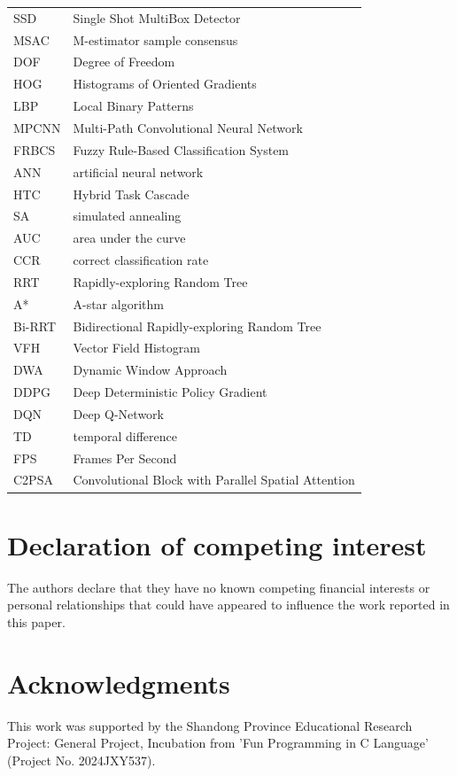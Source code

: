 \documentclass[a4paper,fleqn]{cas-dc}
\begin{document}
{\begin{tabular}{@{}p{2cm}p{5cm}}
  SSD & Single Shot MultiBox Detector \\
  MSAC & M-estimator sample consensus \\
  DOF & Degree of Freedom \\
  HOG & Histograms of Oriented Gradients \\
  LBP & Local Binary Patterns \\
  MPCNN & Multi-Path Convolutional Neural Network \\
  FRBCS & Fuzzy Rule-Based Classification System \\
  ANN & artificial neural network \\
  HTC	    & Hybrid Task Cascade \\
  SA & simulated annealing \\
  AUC		& area under the curve \\
  CCR & correct classification rate \\
  RRT & Rapidly-exploring Random Tree \\
  A*	  & A-star algorithm	\\
  Bi-RRT & Bidirectional Rapidly-exploring Random Tree \\
  VFH & Vector Field Histogram \\
  DWA & Dynamic Window Approach \\
  DDPG & Deep Deterministic Policy Gradient \\
  DQN & Deep Q-Network \\
  TD & temporal difference \\
  FPS & Frames Per Second \\
  C2PSA	& Convolutional Block with Parallel Spatial Attention \\
\bottomrule
	\end{tabular}
}

\section*{Declaration of competing interest}
The authors declare that they have no known competing financial
interests or personal relationships that could have appeared
to influence the work reported in this paper.

\section{Acknowledgments}  
This work was supported by the Shandong Province Educational Research Project: General Project, Incubation from 'Fun Programming in C Language' (Project No. 2024JXY537). 

\clearpage
{}
 	


\vskip6pt
\end{document}
